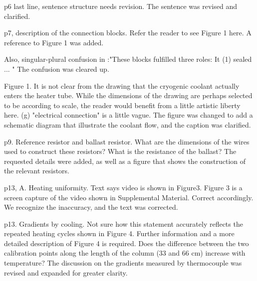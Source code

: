 \documentclass[10pt]{article}
\begin{document}
\begin{response}{p6 last line, sentence structure needs revision.
	}  The sentence was revised and clarified.
\end{response}

\begin{response}{p7, description of the connection blocks. Refer the reader to see Figure 1 here. 
	}  A reference to Figure 1 was added.
\end{response}

\begin{response}{Also, singular-plural confusion in :"These blocks fulfilled three roles: It (1) sealed ... "
	}  
	The confusion was cleared up. 
\end{response}

\begin{response}{Figure 1. It is not clear from the drawing that the cryogenic
coolant actually enters the heater tube. While the dimensions of the drawing are
perhaps selected to be according to scale, the reader would benefit from a
little artistic liberty here. (g) "electrical connection" is a little vague.
	} The figure was changed to add a schematic diagram that illustrate the coolant
	flow, and the caption was clarified.
\end{response}

\begin{response}{p9. Reference resistor and ballast resistor. What are the
dimensions of the wires used to construct these resistors? What is the
resistance of the ballast? 
	} 
	The requested details were added, as well as a figure that shows the construction of the relevant resistors.
\end{response}

\begin{response}{p13, A. Heating uniformity. Text says video is shown in
Figure3. Figure 3 is a screen capture of the video shown in Supplemental
Material. Correct accordingly.
	}
	We recognize the inaccuracy, and the text was corrected. 
\end{response}

\begin{response}{ p13. Gradients by cooling. Not sure how this statement
accurately reflects the repeated heating cycles shown in Figure 4. Further
information and a more detailed description of Figure 4 is required. Does the
difference between the two calibration points along the length of the column (33
and 66 cm) increase with temperature? 
	}  
	The discussion on the gradients measured by thermocouple was revised and expanded for greater clarity. 
\end{response}
\end{document}
